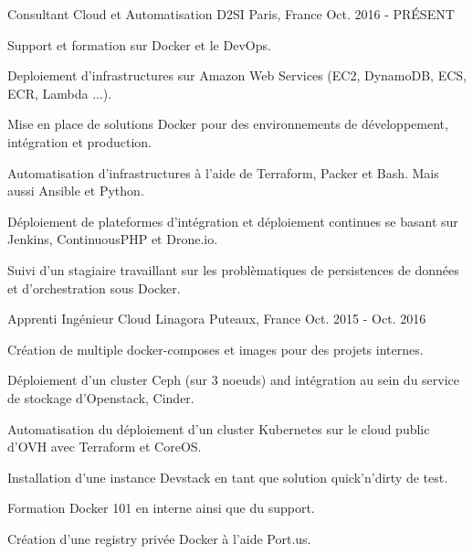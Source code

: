 

\begin{cventries}

  \cventry
    {Consultant Cloud et Automatisation} %
    {D2SI} %
    {Paris, France} %
    {Oct. 2016 - PRÉSENT} %
    {
      \begin{cvitems} %
        \item {Support et formation sur Docker et le DevOps.}
        \item {Deploiement d'infrastructures sur Amazon Web Services (EC2, DynamoDB, ECS, ECR, Lambda ...).}
        \item {Mise en place de solutions Docker pour des environnements de développement, intégration et production.}
        \item {Automatisation d'infrastructures à l'aide de Terraform, Packer et Bash. Mais aussi Ansible et Python.}
        \item {Déploiement de plateformes d'intégration et déploiement continues se basant sur Jenkins, ContinuousPHP et Drone.io.}
        \item {Suivi d'un stagiaire travaillant sur les problèmatiques de persistences de données et d'orchestration sous Docker.}
      \end{cvitems}
    }

  \cventry
    {Apprenti Ingénieur Cloud} %
    {Linagora} %
    {Puteaux, France} %
    {Oct. 2015 - Oct. 2016} %
    {
      \begin{cvitems} %
        \item {Création de multiple docker-composes et images pour des projets internes.}
        \item {Déploiement d'un cluster Ceph (sur 3 noeuds) and intégration au sein du service de stockage d'Openstack, Cinder.}
        \item {Automatisation du déploiement d'un cluster Kubernetes sur le cloud public d'OVH avec Terraform et CoreOS.}
        \item {Installation d'une instance Devstack en tant que solution quick'n'dirty de test.}
        \item {Formation Docker 101 en interne ainsi que du support.}
        \item {Création d'une registry privée Docker à l'aide Port.us.}
      \end{cvitems}
    }


\end{cventries}

